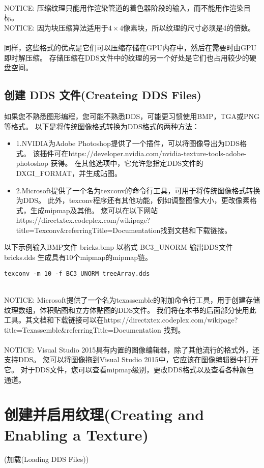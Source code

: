 \begin{flushleft}
~\\
NOTICE: 压缩纹理只能用作渲染管道的着色器阶段的输入，而不能用作渲染目标。\\
NOTICE: 因为块压缩算法适用于$4\times 4$像素块，所以纹理的尺寸必须是4的倍数。\\
~\\
同样，这些格式的优点是它们可以压缩存储在GPU内存中，然后在需要时由GPU即时解压缩。 存储压缩在DDS文件中的纹理的另一个好处是它们也占用较少的硬盘空间。
\end{flushleft}

\subsection{创建 DDS 文件(Createing DDS Files)}
\begin{flushleft}
如果您不熟悉图形编程，您可能不熟悉DDS，可能更习惯使用BMP，TGA或PNG等格式。 以下是将传统图像格式转换为DDS格式的两种方法：\\
\end{flushleft}

\begin{itemize} 
  \item 1.NVIDIA为Adobe Photoshop提供了一个插件，可以将图像导出为DDS格式。 该插件可在https://developer.nvidia.com/nvidia-texture-tools-adobe-photoshop 获得。 在其他选项中，它允许您指定DDS文件的DXGI\_FORMAT，并生成贴图。
  \item 2.Microsoft提供了一个名为texconv的命令行工具，可用于将传统图像格式转换为DDS。 此外，texconv程序还有其他功能，例如调整图像大小，更改像素格式，生成mipmap及其他。 您可以在以下网站https://directxtex.codeplex.com/wikipage?title=Texconv&referringTitle=Documentation找到文档和下载链接。
\end{itemize}

\begin{flushleft}
以下示例输入BMP文件 bricks.bmp 以格式 BC3\_UNORM 输出DDS文件 bricks.dds 生成具有10个mipmap的mipmap链。
\end{flushleft}

\begin{lstlisting}
texconv -m 10 -f BC3_UNORM treeArray.dds
\end{lstlisting}

\begin{flushleft}
~\\
NOTICE:  Microsoft提供了一个名为texassemble的附加命令行工具，用于创建存储纹理数组，体积贴图和立方体贴图的DDS文件。 我们将在本书的后面部分使用此工具。其文档和下载链接可以在https://directxtex.codeplex.com/wikipage?title=Texassemble&referringTitle=Documentation 找到。\\
~\\
NOTICE: Visual Studio 2015具有内置的图像编辑器，除了其他流行的格式外，还支持DDS。 您可以将图像拖到Visual Studio 2015中，它应该在图像编辑器中打开它。 对于DDS文件，您可以查看mipmap级别，更改DDS格式以及查看各种颜色通道。\\
\end{flushleft}

\section{创建并启用纹理(Creating and Enabling a Texture)}
\suhsection(加载(Loading DDS Files))



